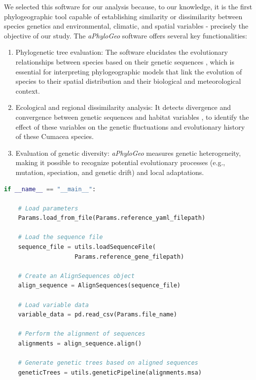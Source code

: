 {We selected this software for our analysis because, to our knowledge, it is the first phylogeographic tool capable of establishing similarity or dissimilarity between species genetics and environmental, climatic, and spatial variables \citep{koshkarov_phylogeography_2022} - precisely the objective of our study. The \textit{aPhyloGeo} software offers several key functionalities:

\begin{enumerate}[label=\arabic*.]
\item Phylogenetic tree evaluation: The software elucidates the evolutionary relationships between species based on their genetic sequences \citep{koshkarov_phylogeography_2022}, which is essential for interpreting phylogeographic models that link the evolution of species to their spatial distribution and their biological and meteorological context.
\item Ecological and regional dissimilarity analysis: It detects divergence and convergence between genetic sequences and habitat variables \citep{koshkarov_phylogeography_2022}, to identify the effect of these variables on the genetic fluctuations and evolutionary history of these Cumacea species.
\item Evaluation of genetic diversity: \textit{aPhyloGeo} measures genetic heterogeneity, making it possible to recognize potential evolutionary processes (e.g., mutation, speciation, and genetic drift) and local adaptations.
\end{enumerate}

\begin{lstlisting}[label=lst:main,language=Python,caption=Main script for tutorial using the aPhyloGeo package.]
if __name__ == "__main__":

    # Load parameters
    Params.load_from_file(Params.reference_yaml_filepath)
    
    # Load the sequence file
    sequence_file = utils.loadSequenceFile(
                    Params.reference_gene_filepath)
    
    # Create an AlignSequences object
    align_sequence = AlignSequences(sequence_file)

    # Load variable data
    variable_data = pd.read_csv(Params.file_name)

    # Perform the alignment of sequences
    alignments = align_sequence.align()

    # Generate genetic trees based on aligned sequences
    geneticTrees = utils.geneticPipeline(alignments.msa)


\end{lstlisting}}
